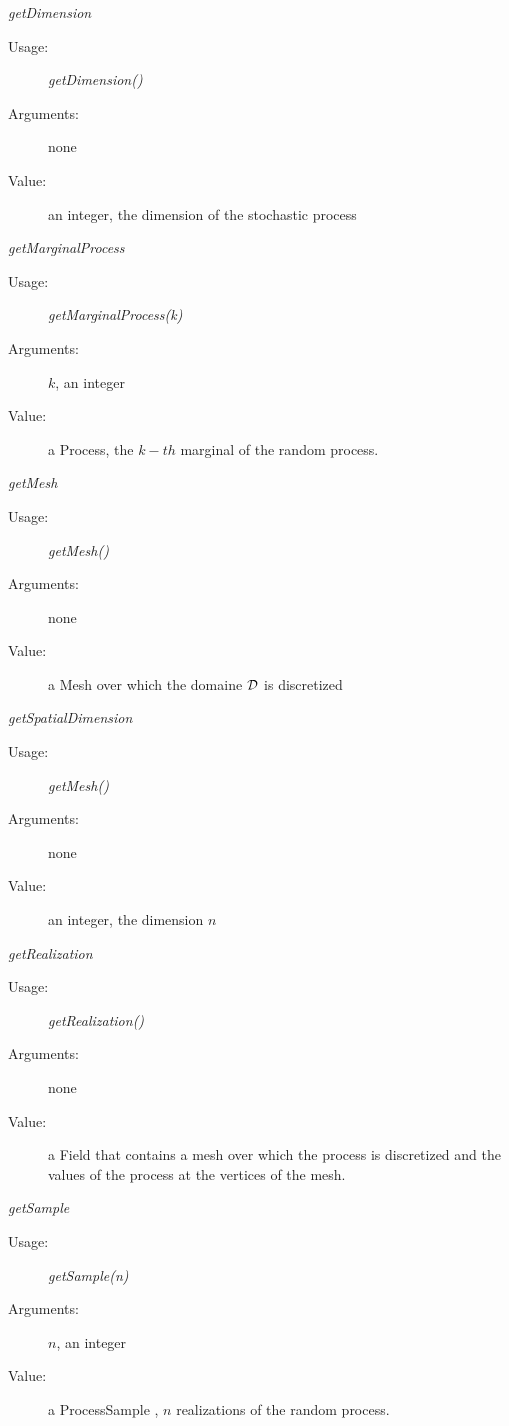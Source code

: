 \begin{description}
\begin{description}
\item \textit{getDimension}
\begin{description}
\item[Usage:] \textit{getDimension()}
\item[Arguments:] none
\item[Value:] an integer, the dimension of the stochastic process
\end{description}
\bigskip

\item \textit{getMarginalProcess}
\begin{description}
\item[Usage:] \textit{getMarginalProcess(k)}
\item[Arguments:] $k$, an integer
\item[Value:] a Process, the $k-th$ marginal of the random process.
\end{description}
\bigskip

\item \textit{getMesh}
\begin{description}
\item[Usage:] \textit{getMesh()}
\item[Arguments:] none
\item[Value:] a Mesh over which the domaine ${\mathcal D}$ is discretized
\end{description}
\bigskip

\item \textit{getSpatialDimension}
\begin{description}
\item[Usage:] \textit{getMesh()}
\item[Arguments:] none
\item[Value:] an integer, the dimension $n$
\end{description}
\bigskip


\item \textit{getRealization}
\begin{description}
\item[Usage:] \textit{getRealization()}
\item[Arguments:] none
\item[Value:] a Field that contains a mesh over which the process is discretized and the values of the process at the vertices of the mesh.
\end{description}
\bigskip

\item \textit{getSample}
\begin{description}
\item[Usage:] \textit{getSample(n)}
\item[Arguments:] $n$, an integer
\item[Value:] a ProcessSample , $n$ realizations of the random process.
\end{description}
\bigskip


\end{description}
\end{description}
